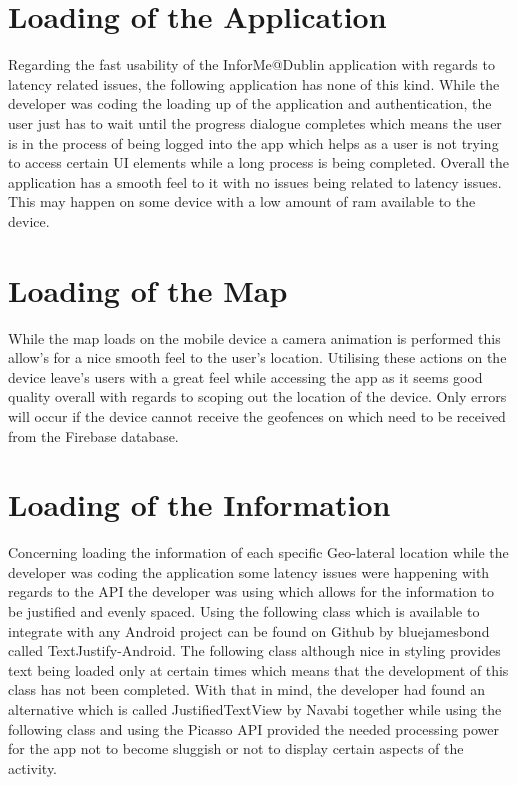\section{Loading of the Application}
Regarding the fast usability of the InforMe@Dublin application with regards to latency related issues, the following application has none of this kind. While the developer was coding the loading up of the application and authentication, the user just has to wait until the progress dialogue completes which means the user is in the process of being logged into the app which helps as a user is not trying to access certain UI elements while a long process is being completed. Overall the application has a smooth feel to it with no issues being related to latency issues. This may happen on some device with a low amount of ram available to the device.

\section{Loading of the Map}
While the map loads on the mobile device a camera animation is performed this allow's for a nice smooth feel to the user's location. Utilising these actions on the device leave's users with a great feel while accessing the app as it seems good quality overall with regards to scoping out the location of the device. Only errors will occur if the device cannot receive the geofences on which need to be received from the Firebase database.

\section{Loading of the Information}
Concerning loading the information of each specific Geo-lateral location while the developer was coding the application some latency issues were happening with regards to the API the developer was using which allows for the information to be justified and evenly spaced. Using the following class which is available to integrate with any Android project can be found on Github by bluejamesbond called TextJustify-Android. The following class although nice in styling provides text being loaded only at certain times which means that the development of this class has not been completed. With that in mind, the developer had found an alternative which is called JustifiedTextView by Navabi together while using the following class and using the Picasso API provided the needed processing power for the app not to become sluggish or not to display certain aspects of the activity.
 

